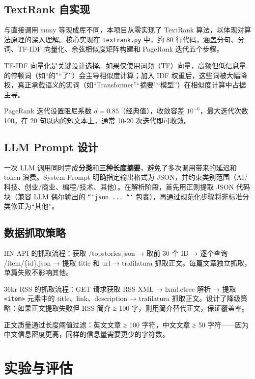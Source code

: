 \documentclass[12pt,a4paper]{ctexart}
\begin{document}
\subsection{TextRank 自实现}

与直接调用 sumy 等现成库不同，本项目从零实现了 TextRank 算法，以体现对算法原理的深入理解。核心实现在 \texttt{textrank.py} 中，约 80 行代码，涵盖分句、分词、TF-IDF 向量化、余弦相似度矩阵构建和 PageRank 迭代五个步骤。

TF-IDF 向量化是关键设计选择。如果仅使用词频（TF）向量，高频但低信息量的停顿词（如“的”“了”）会主导相似度计算；加入 IDF 权重后，这些词被大幅降权，真正承载语义的实词（如“Transformer”“摘要”“模型”）在相似度计算中占据主导。

PageRank 迭代设置阻尼系数 $d=0.85$（经典值），收敛容差 $10^{-6}$，最大迭代次数 100。在 20 句以内的短文本上，通常 10-20 次迭代即可收敛。

\subsection{LLM Prompt 设计}

一次 LLM 调用同时完成\textbf{分类}和\textbf{三种长度摘要}，避免了多次调用带来的延迟和 token 浪费。System Prompt 明确指定输出格式为 JSON，并约束类别范围（AI/科技、创业/商业、编程/技术、其他）。在解析阶段，首先用正则提取 JSON 代码块（兼容 LLM 偶尔输出的 \texttt{```json ... ```} 包裹），再通过规范化步骤将非标准分类修正为“其他”。

\subsection{数据抓取策略}

HN API 的抓取流程：获取 /topstories.json → 取前 30 个 ID → 逐个查询 /item/\{id\}.json → 提取 title 和 url → trafilatura 抓取正文。每篇文章独立抓取，单篇失败不影响其他。

36kr RSS 的抓取流程：GET 请求获取 RSS XML → lxml.etree 解析 → 提取 \texttt{<item>} 元素中的 title、link、description → trafilatura 抓取正文。设计了降级策略：如果正文提取失败但 RSS 简介 ≥ 100 字，则用简介替代正文，保证覆盖率。

正文质量通过长度阈值过滤：英文文章 ≥ 100 字符，中文文章 ≥ 50 字符——因为中文信息密度更高，同样的信息量需要更少的字符数。

\section{实验与评估}
\end{document}
